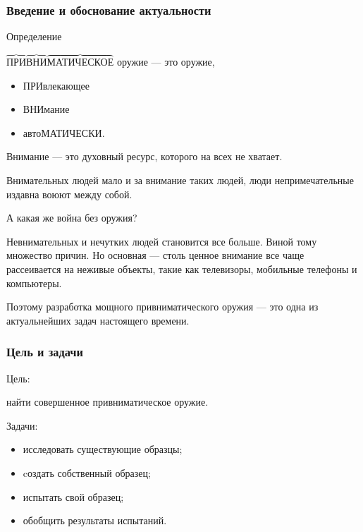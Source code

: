 \begin{frame}
    \frametitle{Введение и обоснование актуальности}
    
    \begin{block}{Определение}
        \par\bigskip
        \alert{$\overbrace{\text{ПРИ}}\overbrace{\text{ВНИ}}\overbrace{\text{МАТИЧЕСКОЕ}}$} оружие --- это оружие, 
        \begin{itemize}
            \item \alert{ПРИ}влекающее 
            \item \alert{ВНИ}мание 
            \item авто\alert{МАТИЧЕСКИ}.
        \end{itemize}
    \end{block}
    
    
    \alert{Внимание} --- это духовный ресурс, которого на всех не хватает. 

    \par\bigskip

    Внимательных людей мало и за внимание таких людей, люди непримечательные издавна воюют между собой. 

    \par\bigskip

    А какая же война без оружия?
\end{frame}
    
Невнимательных и нечутких людей становится все больше. Виной тому множество причин. Но основная --- столь ценное внимание все чаще рассеивается на неживые объекты, такие как телевизоры, мобильные телефоны и компьютеры.
    
Поэтому разработка мощного привниматического оружия --- это одна из актуальнейших задач настоящего времени.

\begin{frame}
    \frametitle{Цель и задачи}
    
    \begin{block}{Цель:}
        \begin{center}
            найти \alert{совершенное} привниматическое оружие.
        \end{center}
    \end{block}
    
    \par\bigskip
    
    \begin{block}{Задачи:}
        \begin{itemize}
            \item исследовать существующие образцы; 
            \item cоздать собственный образец;
            \item испытать свой образец;
            \item обобщить результаты испытаний.
        \end{itemize}
    \end{block}
\end{frame}



